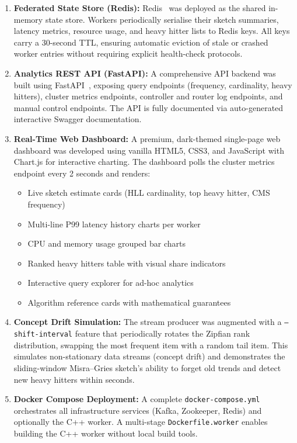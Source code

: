 \begin{enumerate}
    \item \textbf{Federated State Store (Redis):}
    Redis~\cite{redis} was deployed as the shared in-memory state store. Workers periodically serialise their sketch summaries, latency metrics, resource usage, and heavy hitter lists to Redis keys. All keys carry a 30-second TTL, ensuring automatic eviction of stale or crashed worker entries without requiring explicit health-check protocols.

    \item \textbf{Analytics REST API (FastAPI):}
    A comprehensive API backend was built using FastAPI~\cite{fastapi}, exposing query endpoints (frequency, cardinality, heavy hitters), cluster metrics endpoints, controller and router log endpoints, and manual control endpoints. The API is fully documented via auto-generated interactive Swagger documentation.

    \item \textbf{Real-Time Web Dashboard:}
    A premium, dark-themed single-page web dashboard was developed using vanilla HTML5, CSS3, and JavaScript with Chart.js for interactive charting. The dashboard polls the cluster metrics endpoint every 2 seconds and renders:
    \begin{itemize}
        \item Live sketch estimate cards (HLL cardinality, top heavy hitter, CMS frequency)
        \item Multi-line P99 latency history charts per worker
        \item CPU and memory usage grouped bar charts
        \item Ranked heavy hitters table with visual share indicators
        \item Interactive query explorer for ad-hoc analytics
        \item Algorithm reference cards with mathematical guarantees
    \end{itemize}

    \item \textbf{Concept Drift Simulation:}
    The stream producer was augmented with a \texttt{--shift-interval} feature that periodically rotates the Zipfian rank distribution, swapping the most frequent item with a random tail item. This simulates non-stationary data streams (concept drift) and demonstrates the sliding-window Misra--Gries sketch's ability to forget old trends and detect new heavy hitters within seconds.

    \item \textbf{Docker Compose Deployment:}
    A complete \texttt{docker-compose.yml} orchestrates all infrastructure services (Kafka, Zookeeper, Redis) and optionally the C++ worker. A multi-stage \texttt{Dockerfile.worker} enables building the C++ worker without local build tools.
\end{enumerate}


